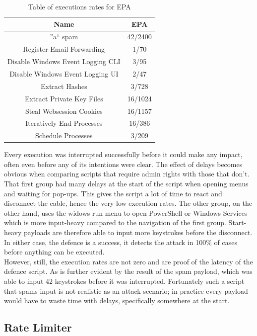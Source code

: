 \begin{table}[h]
\centering
\begin{tabular}{|c|c|}
\hline
Name & EPA  \\
\hline
''a`` spam & 42/2400 \\
\hline
Register Email Forwarding & 1/70  \\
\hline
Disable Windows Event Logging CLI &  3/95 \\
\hline
Disable Windows Event Logging UI & 2/47 \\
\hline
Extract Hashes & 3/728  \\
\hline
Extract Private Key Files & 16/1024 \\
\hline
Steal Websession Cookies & 16/1157 \\
\hline
Iteratively End Processes & 16/386 \\
\hline
Schedule Processes & 3/209 \\
\hline
\end{tabular}
\caption{Table of executions rates for EPA}
\label{table:EPA_results}
\end{table}

Every execution was interrupted successfully before it could make any impact, often even before any of its intentions were clear. The effect of delays becomes obvious when comparing scripts that require admin rights with those that don't. That first group had many delays at the start of the script when opening menus and waiting for pop-ups. This gives the script a lot of time to react and disconnect the cable, hence the very low execution rates. The other group, on the other hand, uses the widows run menu to open PowerShell or Windows Services which is more input-heavy compared to the navigation of the first group. Start-heavy payloads are therefore able to input more keystrokes before the disconnect. In either case, the defence is a success, it detects the attack in 100\% of cases before anything can be executed. \\
However, still, the execution rates are not zero and are proof of the latency of the defence script. As is further evident by the result of the spam payload, which was able to input 42 keystrokes before it was interrupted.  Fortunately such a script that spams input is not realistic as an attack scenario; in practice every payload would have to waste time with delays, specifically somewhere at the start. 


\subsection{Rate Limiter}

